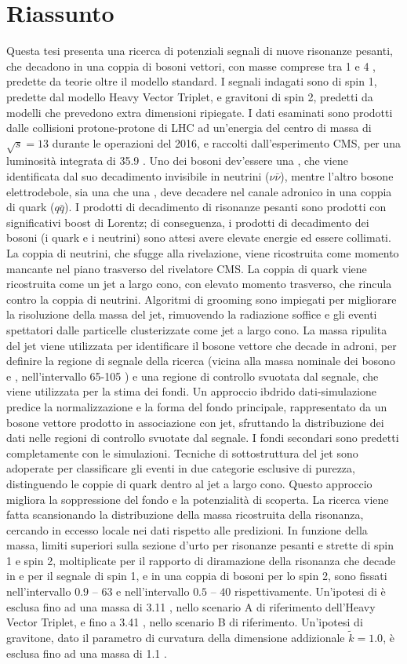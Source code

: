 \chapter*{Riassunto}
\label{ch:riassunto}

Questa tesi presenta una ricerca di potenziali segnali di nuove risonanze pesanti, che decadono in una coppia di bosoni vettori, con masse comprese tra 1 \TeV e 4 \TeV, predette da teorie oltre il modello standard. I segnali indagati sono \Wp di spin 1, predette dal modello Heavy Vector Triplet, e gravitoni di spin 2, predetti da modelli che prevedono extra dimensioni ripiegate. I dati esaminati sono prodotti dalle collisioni protone-protone di LHC ad un'energia del centro di massa di $\sqrt{s}=13$ \TeV durante le operazioni del 2016, e raccolti dall'esperimento CMS, per una luminosit\`a integrata di 35.9 \fbinv. Uno dei bosoni dev'essere una \Z, che viene identificata dal suo decadimento invisibile in neutrini ($\nu \bar{\nu}$), mentre l'altro bosone elettrodebole, sia una \W che una \Z, deve decadere nel canale adronico in una coppia di quark ($q \bar{q}$). I prodotti di decadimento di risonanze pesanti sono prodotti con significativi boost di Lorentz; di conseguenza, i prodotti di decadimento dei bosoni (i quark e i neutrini) sono attesi avere elevate energie ed essere collimati. La coppia di neutrini, che sfugge alla rivelazione, viene ricostruita come momento mancante nel piano trasverso del rivelatore CMS. La coppia di quark viene ricostruita come un jet a largo cono, con elevato momento trasverso, che rincula contro la coppia di neutrini. Algoritmi di grooming sono impiegati per migliorare la risoluzione della massa del jet, rimuovendo la radiazione soffice e gli eventi spettatori dalle particelle clusterizzate come jet a largo cono. La massa ripulita del jet viene utilizzata per identificare il bosone vettore che decade in adroni, per definire la regione di segnale della ricerca (vicina alla massa nominale dei bosono \W e \Z, nell'intervallo 65-105 \GeV) e una regione di controllo svuotata dal segnale, che viene utilizzata per la stima dei fondi. Un approccio ibdrido dati-simulazione predice la normalizzazione e la forma del fondo principale, rappresentato da un bosone vettore prodotto in associazione con jet, sfruttando la distribuzione dei dati nelle regioni di controllo svuotate dal segnale. I fondi secondari sono predetti completamente con le simulazioni. Tecniche di sottostruttura del jet sono adoperate per classificare gli eventi in due categorie esclusive di purezza, distinguendo le coppie di quark dentro al jet a largo cono. Questo approccio migliora la soppressione del fondo e la potenzialit\`a di scoperta. La ricerca viene fatta scansionando la distribuzione della massa ricostruita della risonanza, cercando in eccesso locale nei dati rispetto alle predizioni. In funzione della massa, limiti superiori sulla sezione d'urto per risonanze pesanti e strette di spin 1 e spin 2, moltiplicate per il rapporto di diramazione della risonanza che decade in \Z e \W per il segnale di spin 1, e in una coppia di bosoni \Z per lo spin 2, sono fissati nell'intervallo $0.9$ -- $63$ \fb e nell'intervallo $0.5$ -- $40$ \fb rispettivamente. Un'ipotesi di \`e esclusa fino ad una massa di 3.11 \TeV, nello scenario A di riferimento dell'Heavy Vector Triplet, e fino a 3.41 \TeV, nello scenario B di riferimento. Un'ipotesi di gravitone, dato il parametro di curvatura della dimensione addizionale $\tilde{k}=1.0$, \`e esclusa fino ad una massa di 1.1 \TeV.

\clearpage

